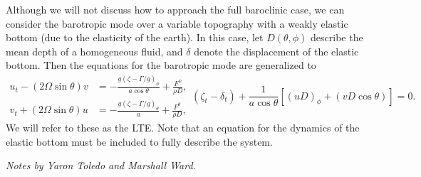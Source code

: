 \documentclass[11pt]{article}
\begin{document}
Although we will not discuss how to approach the full baroclinic case, we can consider the barotropic mode over a variable topography with a weakly elastic bottom (due to the elasticity of the earth). In this case, let $D(\theta, \phi)$ describe the mean depth of a homogeneous fluid, and $\delta$ denote the displacement of the elastic bottom. Then the equations for the barotropic mode are generalized to
\begin{subequations}
\begin{align}
u_t - \left(2\Omega \sin \theta \right) v &= - \frac{g\left(\zeta - \Gamma/g \right)_\phi}{a \cos \theta} + \frac{F^{\phi}}{\rho D}, \\
v_t + \left(2\Omega \sin \theta \right) u &= - \frac{g\left(\zeta - \Gamma/g \right)_\theta}{a} + \frac{F^{\theta}}{\rho D},
\end{align}
\begin{equation}
\left(\zeta_t - \delta_t\right) + \frac{1}{a \cos \theta} \left[\left(u D \right)_\phi + \left(v D \cos \theta \right) \right] = 0.
\end{equation}
\end{subequations}
We will refer to these as the LTE. Note that an equation for the dynamics of the elastic bottom must be included to fully describe the system.

\vspace{5mm}
\noindent
\emph{Notes by Yaron Toledo and Marshall Ward.}






%
\end{document}
